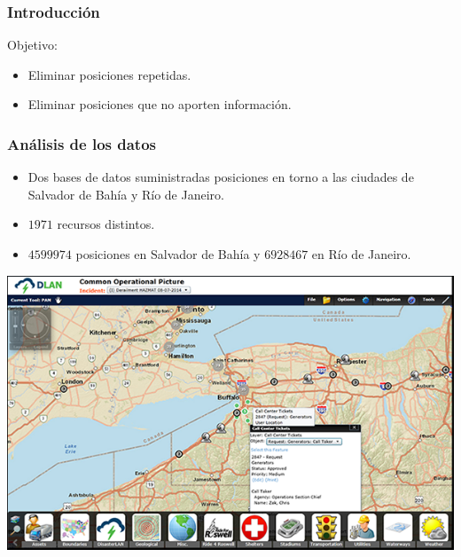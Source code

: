 \documentclass[10pt, spanish]{beamer}
\begin{document}
\begin{frame}[fragile]
  \frametitle{Introducci\'on}
  Objetivo:
  \begin{itemize}
  	  \item Eliminar posiciones repetidas.
  	  \item Eliminar posiciones que no aporten informaci\'on.
   \end{itemize}
\end{frame}


\begin{frame}[fragile]
\frametitle{An\'alisis de los datos}
\begin{itemize}
	\item Dos bases de datos suministradas posiciones en torno a las ciudades de Salvador de Bah\'ia y R\'io de Janeiro.
	\item $1971$ recursos distintos.
	\item $4599974$ posiciones en Salvador de Bah\'ia y $6928467$ en R\'io de Janeiro.	
\end{itemize}

\begin{center}
\includegraphics[scale=.55]{GIS.png}
\end{center}

\end{frame}
\end{document}
